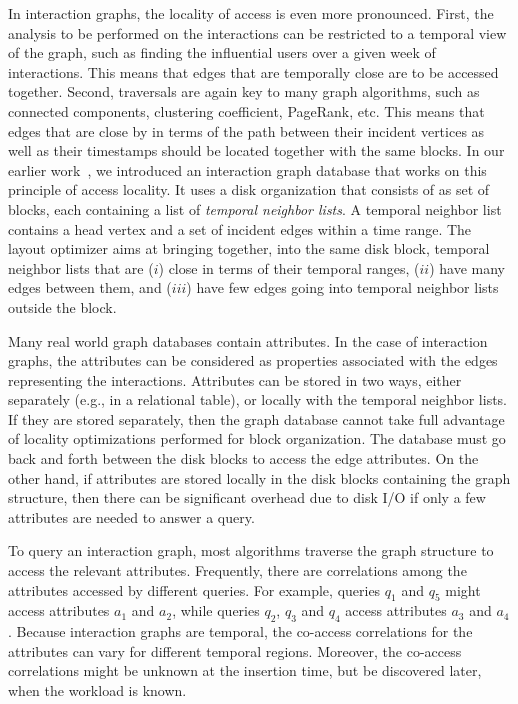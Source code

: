 In interaction graphs, the locality of access is even more pronounced. First, 
the analysis to be performed on the interactions can be restricted to a
temporal view of the graph, such as finding the influential users over a given
week of interactions. This means that edges that are temporally close are to
be accessed together. Second, traversals are again key to many graph
algorithms, such as connected components, clustering coefficient, PageRank,
etc. This means that edges that are close by in terms of the path between
their incident vertices as well as their timestamps should be located together
with the same blocks.  In our earlier work~\cite{gedik14}, we introduced an
interaction graph database that works on this principle of access locality. It
uses a disk organization that consists of as set of blocks, each containing a
list of \emph{temporal neighbor lists}. A temporal neighbor list contains a
head vertex and a set of incident edges within a time range. The layout
optimizer aims at bringing together, into the same disk block, temporal
neighbor lists that are ($i$) close in terms of their temporal ranges, ($ii$)
have many edges between them, and ($iii$) have few edges going into temporal
neighbor lists outside the block.

Many real world graph databases contain attributes. In the case of interaction
graphs, the attributes can be considered as properties associated with the
edges representing the interactions. Attributes can be stored in two ways,
either separately (e.g., in a relational table), or locally with the temporal
neighbor lists.  If they are stored separately, then the graph database cannot
take full advantage of locality optimizations performed for block
organization. The database must go back and forth between the disk blocks to
access the edge attributes.  On the other hand, if attributes are stored
locally in the disk blocks containing the graph structure, then there can be
significant overhead due to disk I/O if only a few attributes are needed to
answer a query. 

To query an interaction graph, most algorithms traverse the graph structure to
access the relevant attributes.  Frequently, there are correlations among the
attributes accessed by different queries. For example, queries $q_1$ and $q_5$
might access attributes $a_1$ and $a_2$, while queries $q_2$, $q_3$ and $q_4$
access attributes $a_3$ and $a_4$. Because interaction graphs are temporal,
the co-access correlations for the attributes can vary for different temporal
regions.  Moreover, the co-access correlations might be unknown at the
insertion time, but be discovered later, when the workload is known.

